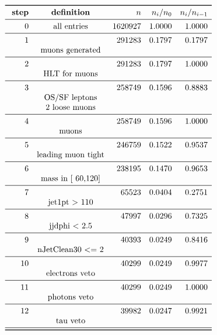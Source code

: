 \documentclass[11pt,a4paper]{article}
\begin{document}
\begin{table}
\caption{\emph{Entries after each selection step, normalised to 5.00 $fb^{-1}$; n is the number of entries after the i-th selection step; Note that cuts on second jet are applied only if a second jet exists with $p_t$ > 30\,GeV.}}
\[
\begin{array}{rcrrr}
\toprule
\ \textbf{step}& \textbf{definition}  & n  &  n_i/n_0 & n_i/n_{i-1}  \\ 
\midrule
 0  & \text{all entries} & 1620927 & 1.0000 & 1.0000 \\
\midrule
 1  & & 291283 & 0.1797 & 0.1797 \\
& \text{muons generated} & & & \\
\midrule
 2  & & 291283 & 0.1797 & 1.0000 \\
& \text{HLT for muons} & & & \\
\midrule
 3  & & 258749 & 0.1596 & 0.8883 \\
& \text{OS/SF leptons} & & & \\
& \text{2 loose muons} & & & \\
\midrule
 4  & & 258749 & 0.1596 & 1.0000 \\
& \text{muons} & & & \\
\midrule
 5  & & 246759 & 0.1522 & 0.9537 \\
& \text{leading muon tight} & & & \\
\midrule
 6  & & 238195 & 0.1470 & 0.9653 \\
& \text{mass in [ 60,120]} & & & \\
\midrule
 7  & &  65523 & 0.0404 & 0.2751 \\
& \text{jet1pt >  110} & & & \\
\midrule
 8  & &  47997 & 0.0296 & 0.7325 \\
& \text{jjdphi < 2.5} & & & \\
\midrule
 9  & &  40393 & 0.0249 & 0.8416 \\
& \text{nJetClean30 <= 2} & & & \\
\midrule
 10  & &  40299 & 0.0249 & 0.9977 \\
& \text{electrons veto} & & & \\
\midrule
 11  & &  40299 & 0.0249 & 1.0000 \\
& \text{photons veto} & & & \\
\midrule
 12  & &  39982 & 0.0247 & 0.9921 \\
& \text{tau veto} & & & \\
\midrule
\bottomrule
\end{array}
\]
\end{table}
\end{document}

